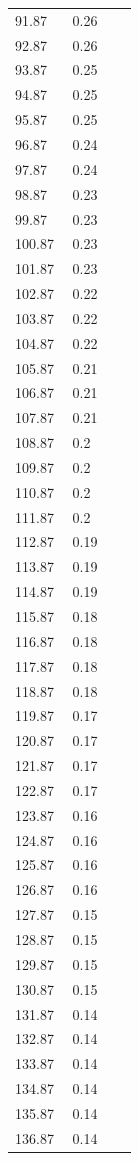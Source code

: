 \documentclass{article}
\begin{document}
\begin{longtable}{p{0.43\linewidth} p{0.49\linewidth}}
91.87 & 0.26 \\
92.87 & 0.26 \\
93.87 & 0.25 \\
94.87 & 0.25 \\
95.87 & 0.25 \\
96.87 & 0.24 \\
97.87 & 0.24 \\
98.87 & 0.23 \\
99.87 & 0.23 \\
100.87 & 0.23 \\
101.87 & 0.23 \\
102.87 & 0.22 \\
103.87 & 0.22 \\
104.87 & 0.22 \\
105.87 & 0.21 \\
106.87 & 0.21 \\
107.87 & 0.21 \\
108.87 & 0.2 \\
109.87 & 0.2 \\
110.87 & 0.2 \\
111.87 & 0.2 \\
112.87 & 0.19 \\
113.87 & 0.19 \\
114.87 & 0.19 \\
115.87 & 0.18 \\
116.87 & 0.18 \\
117.87 & 0.18 \\
118.87 & 0.18 \\
119.87 & 0.17 \\
120.87 & 0.17 \\
121.87 & 0.17 \\
122.87 & 0.17 \\
123.87 & 0.16 \\
124.87 & 0.16 \\
125.87 & 0.16 \\
126.87 & 0.16 \\
127.87 & 0.15 \\
128.87 & 0.15 \\
129.87 & 0.15 \\
130.87 & 0.15 \\
131.87 & 0.14 \\
132.87 & 0.14 \\
133.87 & 0.14 \\
134.87 & 0.14 \\
135.87 & 0.14 \\
136.87 & 0.14 \\

\end{longtable}
\end{document}
